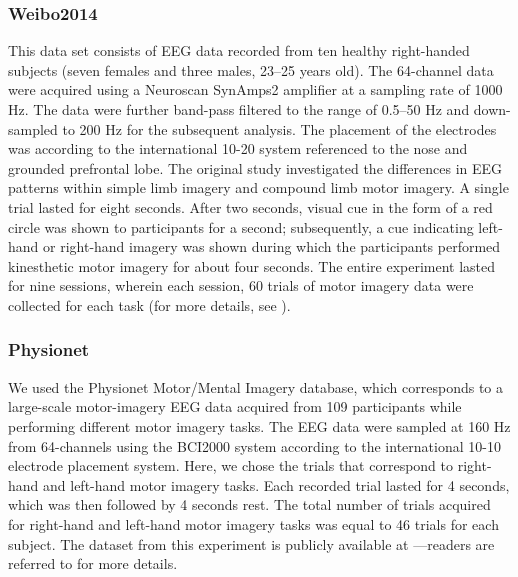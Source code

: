 \documentclass{ieeeaccess}
\begin{document}
    \subsubsection{Weibo2014}
    This data set consists of EEG data recorded from ten healthy right-handed subjects (seven females and three males, 23–25 years old). The 64-channel data were acquired using a Neuroscan SynAmps2 amplifier at a sampling rate of 1000 Hz. The data were further band-pass filtered to the range of 0.5–50 Hz and down-sampled to 200 Hz for the subsequent analysis. The placement of the electrodes was according to the international 10-20 system referenced to the nose and grounded prefrontal lobe.  The original study investigated the differences in EEG patterns within simple limb imagery and compound limb motor imagery. A single trial lasted for eight seconds. After two seconds, visual cue in the form of a red circle was shown to participants for a second; subsequently, a cue indicating left-hand or right-hand imagery was shown during which the participants performed kinesthetic motor imagery for about four seconds.  The entire experiment lasted for nine sessions, wherein each session, 60 trials of motor imagery data were collected for each task (for more details, see \cite{yi2014evaluation}). 
    
    \subsubsection{Physionet}
  
    We used the Physionet Motor/Mental Imagery database, which corresponds to a large-scale motor-imagery EEG data acquired from 109 participants while performing different motor imagery tasks. The EEG data were sampled at 160 Hz from 64-channels using the BCI2000 system according to the international 10-10 electrode placement system. 
    Here, we chose the trials that correspond to right-hand and left-hand motor imagery tasks. Each recorded trial lasted for 4 seconds, which was then followed by 4 seconds rest. The total number of trials acquired for right-hand and left-hand motor imagery tasks was equal to 46 trials for each subject. The dataset from this experiment is publicly available at \cite{Physiobank}---readers are referred to \cite{goldberger2000physiobank, schalk2004bci2000} for more details.
     
\end{document}
